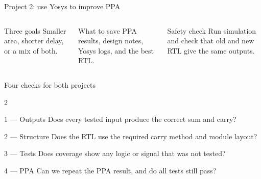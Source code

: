 \documentclass[aspectratio=169,11pt]{beamer}
\begin{document}
\begin{frame}{Project 2: use Yosys to improve PPA}
  \begin{columns}[c,onlytextwidth]
      \centering
      \begin{goodcard}[fontupper=\scriptsize]{Three goals}
        Smaller area, shorter delay, or a mix of both.
      \end{goodcard}
      \vspace{5pt}
      \begin{card}[fontupper=\scriptsize]{What to save}
        PPA results, design notes, Yosys logs, and the best RTL.
      \end{card}
      \vspace{5pt}
      \begin{alertcard}[fontupper=\scriptsize]{Safety check}
        Run simulation and check that old and new RTL give the same outputs.
      \end{alertcard}
  \end{columns}
\end{frame}

\begin{frame}{Four checks for both projects}
  \begin{cardrow}{2}
    \begin{card}{1 --- Outputs}
      Does every tested input produce the correct sum and carry?
    \end{card}
    \begin{card}{2 --- Structure}
      Does the RTL use the required carry method and module layout?
    \end{card}
    \begin{goodcard}{3 --- Tests}
      Does coverage show any logic or signal that was not tested?
    \end{goodcard}
    \begin{goodcard}{4 --- PPA}
      Can we repeat the PPA result, and do all tests still pass?
    \end{goodcard}
  \end{cardrow}
\end{frame}
\end{document}
